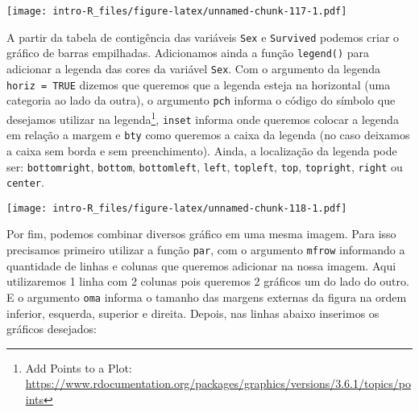 \documentclass[]{book}
\newenvironment{Shaded}{\begin{snugshade}}{\end{snugshade}}
\newcommand{\DataTypeTok}[1]{\textcolor[rgb]{0.13,0.29,0.53}{#1}}
\newcommand{\DecValTok}[1]{\textcolor[rgb]{0.00,0.00,0.81}{#1}}
\newcommand{\KeywordTok}[1]{\textcolor[rgb]{0.13,0.29,0.53}{\textbf{#1}}}
\newcommand{\NormalTok}[1]{#1}
\newcommand{\OperatorTok}[1]{\textcolor[rgb]{0.81,0.36,0.00}{\textbf{#1}}}
\newcommand{\OtherTok}[1]{\textcolor[rgb]{0.56,0.35,0.01}{#1}}
\newcommand{\StringTok}[1]{\textcolor[rgb]{0.31,0.60,0.02}{#1}}
\let\rmarkdownfootnote\footnote%
\def\footnote{\protect\rmarkdownfootnote}
\theoremstyle{definition}
\theoremstyle{definition}
\theoremstyle{definition}
\theoremstyle{remark}
\begin{document}
\texttt{[image: intro-R\_files/figure-latex/unnamed-chunk-117-1.pdf]}

A partir da tabela de contigência das variáveis \texttt{Sex} e \texttt{Survived} podemos criar o gráfico de barras empilhadas. Adicionamos ainda a função \texttt{legend()} para adicionar a legenda das cores da variável \texttt{Sex}. Com o argumento da legenda \texttt{horiz\ =\ TRUE} dizemos que queremos que a legenda esteja na horizontal (uma categoria ao lado da outra), o argumento \texttt{pch} informa o código do símbolo que desejamos utilizar na legenda\footnote{Add Points to a Plot: \url{https://www.rdocumentation.org/packages/graphics/versions/3.6.1/topics/points}}, \texttt{inset} informa onde queremos colocar a legenda em relação a margem e \texttt{bty} como queremos a caixa da legenda (no caso deixamos a caixa sem borda e sem preenchimento). Ainda, a localização da legenda pode ser: \texttt{bottomright}, \texttt{bottom}, \texttt{bottomleft}, \texttt{left}, \texttt{topleft}, \texttt{top}, \texttt{topright}, \texttt{right} ou \texttt{center}.

\begin{Shaded}
\end{Shaded}

\texttt{[image: intro-R\_files/figure-latex/unnamed-chunk-118-1.pdf]}

Por fim, podemos combinar diversos gráfico em uma mesma imagem. Para isso precisamos primeiro utilizar a função \texttt{par}, com o argumento \texttt{mfrow} informando a quantidade de linhas e colunas que queremos adicionar na nossa imagem. Aqui utilizaremos 1 linha com 2 colunas pois queremos 2 gráficos um do lado do outro. E o argumento \texttt{oma} informa o tamanho das margens externas da figura na ordem inferior, esquerda, superior e direita. Depois, nas linhas abaixo inserimos os gráficos desejados:
\end{document}
